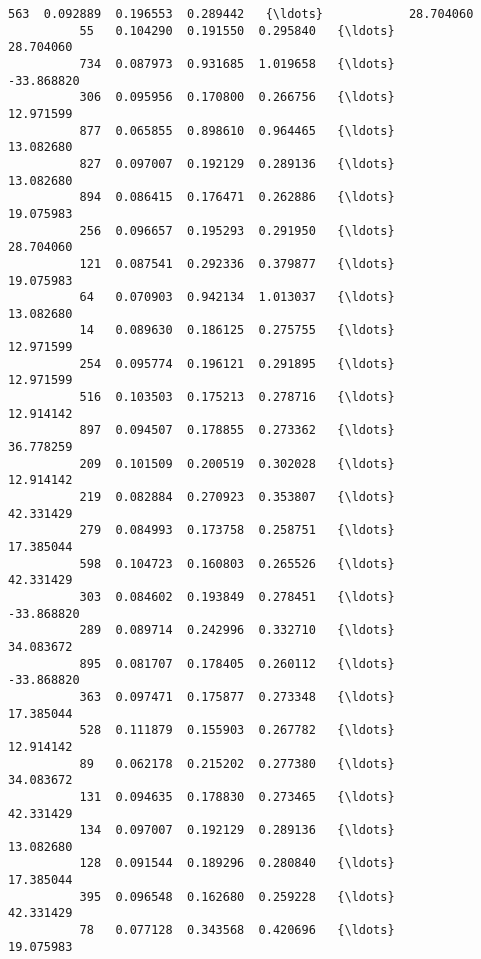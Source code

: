 \documentclass[11pt]{article}
\begin{document}
\begin{Verbatim}[commandchars=\\\{\}]
          563  0.092889  0.196553  0.289442   {\ldots}            28.704060   
          55   0.104290  0.191550  0.295840   {\ldots}            28.704060   
          734  0.087973  0.931685  1.019658   {\ldots}           -33.868820   
          306  0.095956  0.170800  0.266756   {\ldots}            12.971599   
          877  0.065855  0.898610  0.964465   {\ldots}            13.082680   
          827  0.097007  0.192129  0.289136   {\ldots}            13.082680   
          894  0.086415  0.176471  0.262886   {\ldots}            19.075983   
          256  0.096657  0.195293  0.291950   {\ldots}            28.704060   
          121  0.087541  0.292336  0.379877   {\ldots}            19.075983   
          64   0.070903  0.942134  1.013037   {\ldots}            13.082680   
          14   0.089630  0.186125  0.275755   {\ldots}            12.971599   
          254  0.095774  0.196121  0.291895   {\ldots}            12.971599   
          516  0.103503  0.175213  0.278716   {\ldots}            12.914142   
          897  0.094507  0.178855  0.273362   {\ldots}            36.778259   
          209  0.101509  0.200519  0.302028   {\ldots}            12.914142   
          219  0.082884  0.270923  0.353807   {\ldots}            42.331429   
          279  0.084993  0.173758  0.258751   {\ldots}            17.385044   
          598  0.104723  0.160803  0.265526   {\ldots}            42.331429   
          303  0.084602  0.193849  0.278451   {\ldots}           -33.868820   
          289  0.089714  0.242996  0.332710   {\ldots}            34.083672   
          895  0.081707  0.178405  0.260112   {\ldots}           -33.868820   
          363  0.097471  0.175877  0.273348   {\ldots}            17.385044   
          528  0.111879  0.155903  0.267782   {\ldots}            12.914142   
          89   0.062178  0.215202  0.277380   {\ldots}            34.083672   
          131  0.094635  0.178830  0.273465   {\ldots}            42.331429   
          134  0.097007  0.192129  0.289136   {\ldots}            13.082680   
          128  0.091544  0.189296  0.280840   {\ldots}            17.385044   
          395  0.096548  0.162680  0.259228   {\ldots}            42.331429   
          78   0.077128  0.343568  0.420696   {\ldots}            19.075983   
          

\end{Verbatim}
\end{document}

